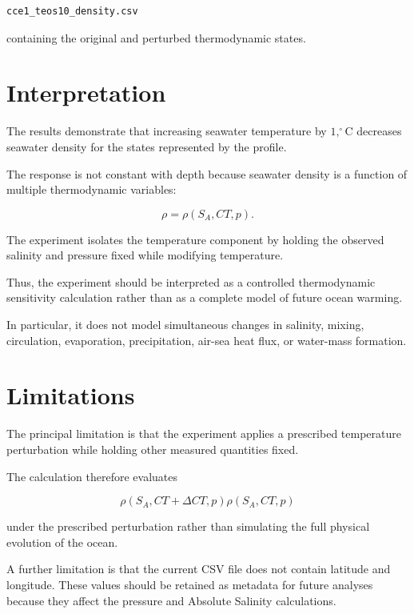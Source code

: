 \documentclass[11pt]{article}
\begin{document}
\begin{verbatim}
cce1_teos10_density.csv
\end{verbatim}

containing the original and perturbed thermodynamic states.

\section{Interpretation}

The results demonstrate that increasing seawater temperature by
$1,^\circ\mathrm{C}$ decreases seawater density for the states
represented by the profile.

The response is not constant with depth because seawater density is a
function of multiple thermodynamic variables:

\begin{equation}
\rho=\rho(S_A,CT,p).
\end{equation}

The experiment isolates the temperature component by holding the
observed salinity and pressure fixed while modifying temperature.

Thus, the experiment should be interpreted as a controlled
thermodynamic sensitivity calculation rather than as a complete model
of future ocean warming.

In particular, it does not model simultaneous changes in salinity,
mixing, circulation, evaporation, precipitation, air-sea heat flux,
or water-mass formation.

\section{Limitations}

The principal limitation is that the experiment applies a prescribed
temperature perturbation while holding other measured quantities
fixed.

The calculation therefore evaluates

\begin{equation}
\rho(S_A,CT+\Delta CT,p)
\rho(S_A,CT,p)
\end{equation}

under the prescribed perturbation rather than simulating the full
physical evolution of the ocean.

A further limitation is that the current CSV file does not contain
latitude and longitude. These values should be retained as metadata
for future analyses because they affect the pressure and Absolute
Salinity calculations.
\end{document}
